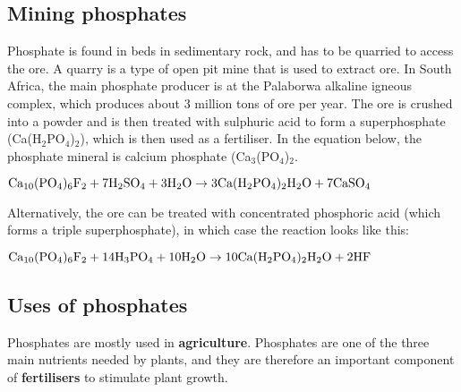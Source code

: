 \subsection{Mining phosphates}

Phosphate is found in beds in sedimentary rock, and has to be quarried to access the ore. A quarry is a type of open pit mine that is used to extract ore. In South Africa, the main phosphate producer is at the Palaborwa alkaline igneous complex, which produces about 3 million tons of ore per year. The ore is crushed into a powder and is then treated with sulphuric acid to form a superphosphate (Ca(H$_{2}$PO$_{4}$)$_{2}$), which is then used as a fertiliser. In the equation below, the phosphate mineral is calcium phosphate (Ca$_{3}$(PO$_{4}$)$_{2}$.

\begin{center}
$\rm{Ca_{10}(PO_{4})_{6}F_{2} + 7H_{2}SO_{4} + 3H_{2}O \rightarrow 3Ca(H_{2}PO_{4})_{2}H_{2}O + 7CaSO_{4}}$
\end{center}

Alternatively, the ore can be treated with concentrated phosphoric acid (which forms a triple superphosphate), in which case the reaction looks like this:

\begin{center}
$\rm{Ca_{10}(PO_{4})_{6}F_{2} + 14H_{3}PO_{4} + 10H_{2}O \rightarrow 10Ca(H_{2}PO_{4})_{2}H_{2}O + 2HF}$
\end{center}

\subsection{Uses of phosphates}

Phosphates are mostly used in \textbf{agriculture}. Phosphates are one of the three main nutrients needed by plants, and they are therefore an important component of \textbf{fertilisers} to stimulate plant growth.

